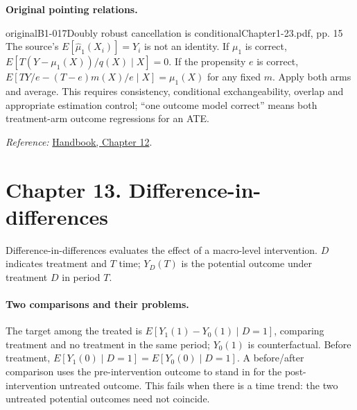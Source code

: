 {\par{}\smallskip\textbf{Original pointing relations.}\par\smallskip
{}
\begin{reviewnote}{original}{B1-017}{Doubly robust cancellation is conditional}{Chapter1-23.pdf, pp. 15}
The source's $E[\hat\mu_1(X_i)]=Y_i$ is not an identity. If $\mu_1$ is correct, $E[T(Y-\mu_1(X))/q(X)\mid X]=0$. If the propensity $e$ is correct, $E[TY/e-(T-e)m(X)/e\mid X]=\mu_1(X)$ for any fixed $m$. Apply both arms and average. This requires consistency, conditional exchangeability, overlap and appropriate estimation control; ``one outcome model correct'' means both treatment-arm outcome regressions for an ATE.
\par\smallskip\textit{Reference:} \href{https://matheusfacure.github.io/python-causality-handbook/12-Doubly-Robust-Estimation.html}{Handbook, Chapter 12}.
\end{reviewnote}
\section{Chapter 13. Difference-in-differences}
Difference-in-differences evaluates the effect of a macro-level intervention. $D$ indicates treatment and $T$ time; $Y_D(T)$ is the potential outcome under treatment $D$ in period $T$.

\paragraph{Two comparisons and their problems.}
The target among the treated is $E[Y_1(1)-Y_0(1)\mid D=1]$, comparing treatment and no treatment in the same period; $Y_0(1)$ is counterfactual. Before treatment, $E[Y_1(0)\mid D=1]=E[Y_0(0)\mid D=1]$. A before/after comparison uses the pre-intervention outcome to stand in for the post-intervention untreated outcome. This fails when there is a time trend: the two untreated potential outcomes need not coincide.

}
